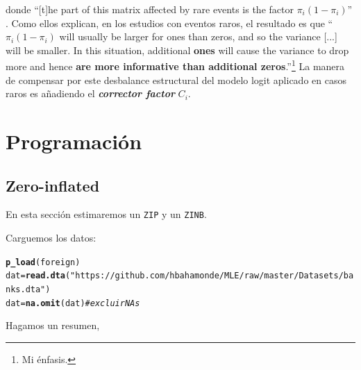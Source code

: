 \documentclass[onesided]{article}\usepackage[]{graphicx}\usepackage[]{color}
\makeatletter
\newcommand{\hlstr}[1]{\textcolor[rgb]{0.192,0.494,0.8}{#1}}%
\newcommand{\hlcom}[1]{\textcolor[rgb]{0.678,0.584,0.686}{\textit{#1}}}%
\newcommand{\hlstd}[1]{\textcolor[rgb]{0.345,0.345,0.345}{#1}}%
\newcommand{\hlkwb}[1]{\textcolor[rgb]{0.69,0.353,0.396}{#1}}%
\newcommand{\hlkwd}[1]{\textcolor[rgb]{0.737,0.353,0.396}{\textbf{#1}}}%
\newenvironment{kframe}{%
 \def\at@end@of@kframe{}%
 \ifinner\ifhmode%
  \def\at@end@of@kframe{\end{minipage}}%
  \begin{minipage}{\columnwidth}%
 \fi\fi%
 \def\FrameCommand##1{\hskip\@totalleftmargin \hskip-\fboxsep
 \colorbox{shadecolor}{##1}\hskip-\fboxsep
     \hskip-\linewidth \hskip-\@totalleftmargin \hskip\columnwidth}%
 \MakeFramed {\advance\hsize-\width
   \@totalleftmargin\z@ \linewidth\hsize
   \@setminipage}}%
 {\par\unskip\endMakeFramed%
 \at@end@of@kframe}
\newenvironment{knitrout}{}{} %
\makeatother
\begin{document}
donde ``[t]he part of this matrix affected by rare events is the factor $\pi_{i}(1-\pi_{i})$'' \parencite[141]{King2001}. Como ellos explican, en los estudios con eventos raros, el resultado es que ``$\pi_{i}(1-\pi_{i})$ will usually be larger for ones than zeros, and so the variance [...] will be smaller. In this situation, additional {\bf ones} will cause the variance to drop more and hence {\bf are more informative than additional zeros}.''\footnote{Mi \'enfasis.} La manera de compensar por este desbalance estructural del modelo logit aplicado en casos raros es a\~nadiendo el \emph{{\bf corrector factor}} $C_{i}$.


\section{Programaci\'on}

\subsection{Zero-inflated}

En esta secci\'on estimaremos un \texttt{ZIP} y un \texttt{ZINB}.

Carguemos los datos:

\begin{knitrout}
\color{fgcolor}\begin{kframe}
\begin{alltt}
\hlkwd{p_load}\hlstd{(foreign)}
\hlstd{dat} \hlkwb{=} \hlkwd{read.dta}\hlstd{(}\hlstr{"https://github.com/hbahamonde/MLE/raw/master/Datasets/banks.dta"}\hlstd{)}
\hlstd{dat} \hlkwb{=} \hlkwd{na.omit}\hlstd{(dat)} \hlcom{# excluir NAs}
\end{alltt}
\end{kframe}
\end{knitrout}

Hagamos un resumen,
\end{document}
